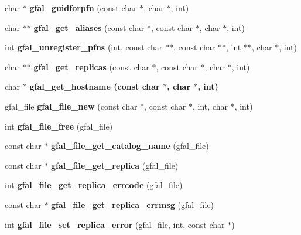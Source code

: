 \begin{CompactItemize}
\item 
char $\ast$ \textbf{gfal\_\-guidforpfn} (const char $\ast$, char $\ast$, int)\label{group__internal__group_g86568afb8c7f9b0d6944de793a3e867a}

\item 
char $\ast$$\ast$ \textbf{gfal\_\-get\_\-aliases} (const char $\ast$, const char $\ast$, char $\ast$, int)\label{group__internal__group_g25d4ae6bef6570590efbc8548e7d79e2}

\item 
int \textbf{gfal\_\-unregister\_\-pfns} (int, const char $\ast$$\ast$, const char $\ast$$\ast$, int $\ast$$\ast$, char $\ast$, int)\label{group__internal__group_g70f889fa2436723fb7b3cff20b661f21}

\item 
char $\ast$$\ast$ \textbf{gfal\_\-get\_\-replicas} (const char $\ast$, const char $\ast$, char $\ast$, int)\label{group__internal__group_gbd0a581309f65e07a5e28d442f07b169}

\item 
char $\ast$ \bf{gfal\_\-get\_\-hostname} (const char $\ast$, char $\ast$, int)
\item 
gfal\_\-file \textbf{gfal\_\-file\_\-new} (const char $\ast$, const char $\ast$, int, char $\ast$, int)\label{group__internal__group_g4c083c77e3b95b63f7a66d9cad7d24b4}

\item 
int \textbf{gfal\_\-file\_\-free} (gfal\_\-file)\label{group__internal__group_g564d0244067d6e1d424cea5ec1336be6}

\item 
const char $\ast$ \textbf{gfal\_\-file\_\-get\_\-catalog\_\-name} (gfal\_\-file)\label{group__internal__group_g8e5135cef19dfa4106dc8a6da1b78721}

\item 
const char $\ast$ \textbf{gfal\_\-file\_\-get\_\-replica} (gfal\_\-file)\label{group__internal__group_ga3feb45524d1a8e8cccd33249ee3ccb7}

\item 
int \textbf{gfal\_\-file\_\-get\_\-replica\_\-errcode} (gfal\_\-file)\label{group__internal__group_g19b575e12fff918eda15bf9933705f9a}

\item 
const char $\ast$ \textbf{gfal\_\-file\_\-get\_\-replica\_\-errmsg} (gfal\_\-file)\label{group__internal__group_ga8418371e63e1c3ee5da57b0b75a0a32}

\item 
int \textbf{gfal\_\-file\_\-set\_\-replica\_\-error} (gfal\_\-file, int, const char $\ast$)\label{group__internal__group_g5de1931dff2c84de9db70f88cfe85662}


\end{CompactItemize}
